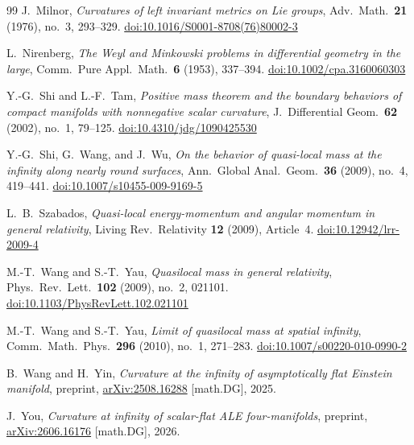 \documentclass[10pt]{amsart}
\theoremstyle{plain}
\theoremstyle{remark}
\begin{document}
\begin{thebibliography}{99}
		J.~Milnor,
		\emph{Curvatures of left invariant metrics on Lie groups},
		Adv.\ Math.\ \textbf{21} (1976), no.~3, 293--329.
		\href{https://doi.org/10.1016/S0001-8708(76)80002-3}{doi:10.1016/S0001-8708(76)80002-3}
		
		L.~Nirenberg,
		\emph{The Weyl and Minkowski problems in differential geometry in the large},
		Comm.\ Pure Appl.\ Math.\ \textbf{6} (1953), 337--394.
		\href{https://doi.org/10.1002/cpa.3160060303}{doi:10.1002/cpa.3160060303}
		
		Y.-G.~Shi and L.-F.~Tam,
		\emph{Positive mass theorem and the boundary behaviors of compact manifolds with nonnegative scalar curvature},
		J.\ Differential Geom.\ \textbf{62} (2002), no.~1, 79--125.
		\href{https://doi.org/10.4310/jdg/1090425530}{doi:10.4310/jdg/1090425530}
		
		Y.-G.~Shi, G.~Wang, and J.~Wu,
		\emph{On the behavior of quasi-local mass at the infinity along nearly round surfaces},
		Ann.\ Global Anal.\ Geom.\ \textbf{36} (2009), no.~4, 419--441.
		\href{https://doi.org/10.1007/s10455-009-9169-5}{doi:10.1007/s10455-009-9169-5}
		
		L.~B.~Szabados,
		\emph{Quasi-local energy-momentum and angular momentum in general relativity},
		Living Rev.\ Relativity \textbf{12} (2009), Article~4.
		\href{https://doi.org/10.12942/lrr-2009-4}{doi:10.12942/lrr-2009-4}
		
		M.-T.~Wang and S.-T.~Yau,
		\emph{Quasilocal mass in general relativity},
		Phys.\ Rev.\ Lett.\ \textbf{102} (2009), no.~2, 021101.
		\href{https://doi.org/10.1103/PhysRevLett.102.021101}{doi:10.1103/PhysRevLett.102.021101}
		
		M.-T.~Wang and S.-T.~Yau,
		\emph{Limit of quasilocal mass at spatial infinity},
		Comm.\ Math.\ Phys.\ \textbf{296} (2010), no.~1, 271--283.
		\href{https://doi.org/10.1007/s00220-010-0990-2}{doi:10.1007/s00220-010-0990-2}
		
		B.~Wang and H.~Yin,
		\emph{Curvature at the infinity of asymptotically flat Einstein manifold},
		preprint, \href{https://arxiv.org/abs/2508.16288}{arXiv:2508.16288} [math.DG], 2025.
		
		J.~You,
		\emph{Curvature at infinity of scalar-flat ALE four-manifolds},
		preprint, \href{https://arxiv.org/abs/2606.16176}{arXiv:2606.16176} [math.DG], 2026.
		
	\end{thebibliography}
	
	
\end{document}
